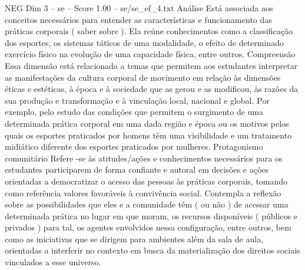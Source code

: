 \begin{textsample}{NEG Dim 3 – se – Score 1.00 – se/se\_ef\_4.txt}
Análise Está associada aos conceitos necessários para entender as características e funcionamento das práticas corporais ( saber sobre ).
Ela reúne conhecimentos como a classificação dos esportes, os sistemas táticos de uma modalidade, o efeito de determinado exercício físico na evolução de uma capacidade física, entre outros.
Compreensão Essa dimensão está relacionada a temas que permitem aos estudantes interpretar as manifestações da cultura corporal de movimento em relação às dimensões éticas e estéticas, à época e à sociedade que as gerou e as modificou, às razões da sua produção e transformação e à vinculação local, nacional e global.
Por exemplo, pelo estudo das condições que permitem o surgimento de uma determinada prática corporal em uma dada região e época ou os motivos pelos quais os esportes praticados por homens têm uma visibilidade e um tratamento midiático diferente dos esportes praticados por mulheres.
Protagonismo comunitário Refere -se às atitudes/ações e conhecimentos necessários para os estudantes participarem de forma confiante e autoral em decisões e ações orientadas a democratizar o acesso das pessoas às práticas corporais, tomando como referência valores favoráveis à convivência social.
Contempla a reflexão sobre as possibilidades que eles e a comunidade têm ( ou não ) de acessar uma determinada prática no lugar em que moram, os recursos disponíveis ( públicos e privados ) para tal, os agentes envolvidos nessa configuração, entre outros, bem como as iniciativas que se dirigem para ambientes além da sala de aula, orientadas a interferir no contexto em busca da materialização dos direitos sociais vinculados a esse universo.

\end{textsample}

